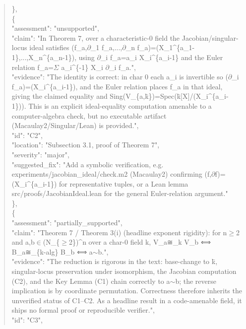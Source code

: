 \documentclass[11pt]{article}
\begin{document}
\begin{quote}
    \},\\
    \{\\
      "assessment": "unsupported",\\
      "claim": "In Theorem 7, over a characteristic-0 field the Jacobian/singular-locus ideal satisfies (f\_a,\ensuremath{\partial}\_1 f\_a,...,\ensuremath{\partial}\_n f\_a)=(X\_1\^{}\{a\_1-1\},...,X\_n\^{}\{a\_n-1\}), using \ensuremath{\partial}\_i f\_a=a\_i X\_i\^{}\{a\_i-1\} and the Euler relation f\_a=\ensuremath{\Sigma} a\_i\^{}\{-1\} X\_i \ensuremath{\partial}\_i f\_a.",\\
      "evidence": "The identity is correct: in char 0 each a\_i is invertible so (\ensuremath{\partial}\_i f\_a)=(X\_i\^{}\{a\_i-1\}), and the Euler relation places f\_a in that ideal, giving the claimed equality and Sing(V\_\{a,k\={}\})=Spec(k\={}[X]/(X\_i\^{}\{a\_i-1\})). This is an explicit ideal-equality computation amenable to a computer-algebra check, but no executable artifact (Macaulay2/Singular/Lean) is provided.",\\
      "id": "C2",\\
      "location": "Subsection 3.1, proof of Theorem 7",\\
      "severity": "major",\\
      "suggested\_fix": "Add a symbolic verification, e.g. experiments/jacobian\_ideal/check.m2 (Macaulay2) confirming (f,\ensuremath{\partial}f)=(X\_i\^{}\{a\_i-1\}) for representative tuples, or a Lean lemma src/proofs/JacobianIdeal.lean for the general Euler-relation argument."\\
    \},\\
    \{\\
      "assessment": "partially\_supported",\\
      "claim": "Theorem 7 / Theorem 3(i) (headline exponent rigidity): for n\ensuremath{\ge}2 and a,b\ensuremath{\in}(N\_\{\ensuremath{\ge}2\})\^{}n over a char-0 field k, V\_a≅\_k V\_b ⟺ B\_a≅\_\{k-alg\} B\_b ⟺ a\ensuremath{\sim}b.",\\
      "evidence": "The reduction is rigorous in the text: base-change to k\={}, singular-locus preservation under isomorphism, the Jacobian computation (C2), and the Key Lemma (C1) chain correctly to a\ensuremath{\sim}b; the reverse implication is by coordinate permutation. Correctness therefore inherits the unverified status of C1--C2. As a headline result in a code-amenable field, it ships no formal proof or reproducible verifier.",\\
      "id": "C3",\\

\end{quote}
\end{document}
